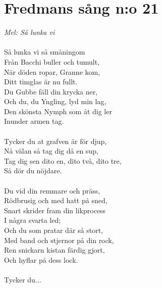 \documentclass[a5paper,15pt]{article}
\begin{document}
\section{Fredmans sång n:o 21}
\emph{Mel: Så lunka vi}\\
\\
Så lunka vi så småningom\\
Från Bacchi buller och tumult,\\
När döden ropar, Granne kom,\\
Ditt timglas är nu fullt.\\
Du Gubbe fäll din krycka ner,\\
Och du, du Yngling, lyd min lag,\\
Den skönsta Nymph som åt dig ler\\
Inunder armen tag.\\
\\
Tycker du at grafven är för djup,\\
Nå välan så tag dig då en sup,\\
Tag dig sen dito en, dito två, dito tre,\\
Så dör du nöjdare.\\
\\
Du vid din remmare och präss,\\
Rödbrusig och med hatt på sned,\\
Snart skrider fram din likprocess\\
I några svarta led;\\
Och du som pratar där så stort,\\
Med band och stjernor på din rock,\\
Ren snickarn kistan färdig gjort,\\
Och hyflar på dess lock.\\
\\
Tycker du...

\setcounter{section}{0}
\renewcommand{\thesection}{X\arabic{section}}
\end{document}
